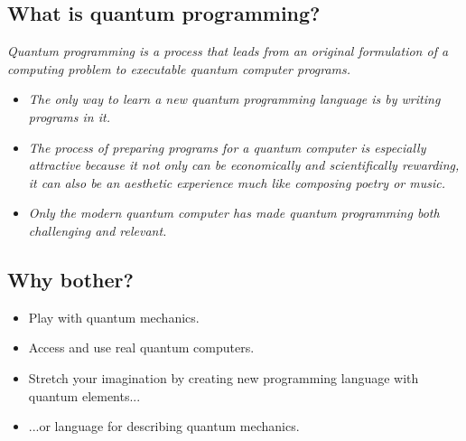 \documentclass{beamer}
\begin{document}
\subsection{What is quantum programming?}
\begin{frame}{\insertsection}{\insertsubsection}
    
\emph{Quantum programming is a process that leads from an 
original formulation of a computing problem to executable quantum computer 
programs.}
\end{frame}


\begin{frame}{\insertsection}{\insertsubsection}

\begin{itemize}
    
    \item<1-> \emph{The only way to learn a new quantum programming language is 
    by writing programs in it.}

    \item<2-> \emph{The process of preparing programs for a quantum computer is 
    especially attractive because it not only can be economically and 
    scientifically rewarding, it can also be an aesthetic experience much like 
    composing poetry or music.}

    \item<3-> \emph{Only the modern quantum computer has made quantum 
    programming both challenging and relevant.}

\end{itemize}
\end{frame}

\subsection{Why bother?}

\begin{frame}{\insertsection}{\insertsubsection}
    
	\begin{itemize}
        \item<1-> Play with quantum mechanics.
        \item<2-> Access and use real quantum computers.
        \item<3-> Stretch your imagination by creating new programming 
        language with quantum elements...
        \item<4->{...or language for describing quantum mechanics.}
    \end{itemize}
	
\end{frame}
\end{document}
